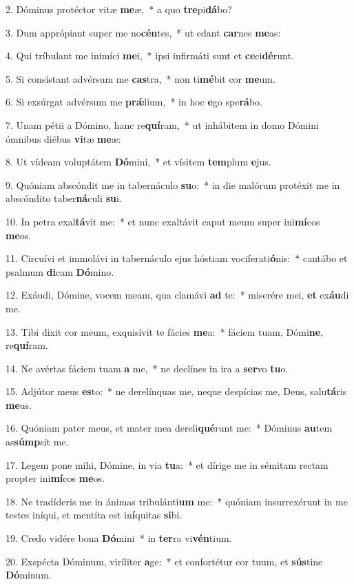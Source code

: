 2. Dóminus protéctor vitæ \textbf{me}æ,~*  a quo \textbf{tre}pi\textbf{dá}bo?\

3. Dum apprópiant super me no\textbf{cén}tes,~*  ut edant \textbf{car}nes \textbf{me}as:\

4. Qui tríbulant me inimíci \textbf{me}i,~*  ipsi infirmáti sunt et \textbf{ce}ci\textbf{dé}runt.\

5. Si consístant advérsum me \textbf{cas}tra,~*  non ti\textbf{mé}bit cor \textbf{me}um.\

6. Si exsúrgat advérsum me \textbf{prǽ}lium,~*  in hoc \textbf{e}go spe\textbf{rá}bo.\

7. Unam pétii a Dómino, hanc re\textbf{quí}ram,~*  ut inhábitem in domo Dómini ómnibus diébus \textbf{vi}tæ \textbf{me}æ:\

8. Ut vídeam voluptátem \textbf{Dó}mini,~*  et vísitem \textbf{tem}plum \textbf{e}jus.\

9. Quóniam abscóndit me in tabernáculo \textbf{su}o:~*  in die malórum protéxit me in abscóndito taber\textbf{ná}culi \textbf{su}i.\

10. In petra exal\textbf{tá}vit me:~*  et nunc exaltávit caput meum super ini\textbf{mí}cos \textbf{me}os.\

11. Circuívi et immolávi in tabernáculo ejus hóstiam vociferati\textbf{ó}nis:~*  cantábo et psalmum \textbf{di}cam \textbf{Dó}mino.\

12. Exáudi, Dómine, vocem meam, qua clamávi \textbf{ad} te:~*  miserére mei, \textbf{et} ex\textbf{áu}di me.\

13. Tibi dixit cor meum, exquisívit te fácies \textbf{me}a:~*  fáciem tuam, Dómi\textbf{ne}, re\textbf{quí}ram.\

14. Ne avértas fáciem tuam \textbf{a} me,~*  ne declínes in ira a \textbf{ser}vo \textbf{tu}o.\

15. Adjútor meus \textbf{es}to:~*  ne derelínquas me, neque despícias me, Deus, salu\textbf{tá}ris \textbf{me}us.\

16. Quóniam pater meus, et mater mea dereli\textbf{qué}runt me:~*  Dóminus \textbf{au}tem as\textbf{súmp}sit me.\

17. Legem pone mihi, Dómine, in via \textbf{tu}a:~*  et dírige me in sémitam rectam propter ini\textbf{mí}cos \textbf{me}os.\

18. Ne tradíderis me in ánimas tribulánti\textbf{um} me:~*  quóniam insurrexérunt in me testes iníqui, et mentíta est in\textbf{í}quitas \textbf{si}bi.\

19. Credo vidére bona \textbf{Dó}mini~*  in \textbf{ter}ra vi\textbf{vén}tium.\

20. Exspécta Dóminum, viríliter \textbf{a}ge:~*  et confortétur cor tuum, et \textbf{sús}tine \textbf{Dó}minum.\

